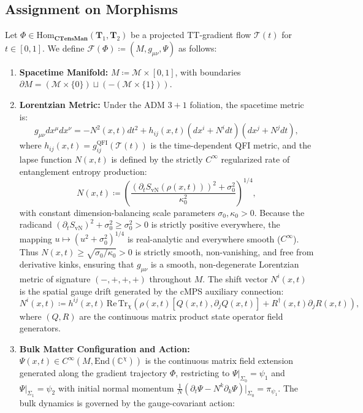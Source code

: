 \documentclass[11pt,a4paper,reqno]{amsart}
\theoremstyle{definition}
\numberwithin{equation}{section}
\newcommand{\CTens}{\mathbf{CTensMan}}
\newcommand{\Tr}{\mathrm{Tr}}
\newcommand{\QFI}{\mathrm{QFI}}
\begin{document}
\subsection{Assignment on Morphisms}
Let $\Phi \in \mathrm{Hom}_{\CTens}(\mathbf{T}_1, \mathbf{T}_2)$ be a projected TT-gradient flow $\mathcal{T}(t)$ for $t \in [0, 1]$.
We define $\mathcal{F}(\Phi) \coloneqq (M, g_{\mu\nu}, \Psi)$ as follows:
\begin{enumerate}
    \item \textbf{Spacetime Manifold:} $M \coloneqq \mathcal{M} \times [0, 1]$, with boundaries $\partial M = (\mathcal{M} \times \{0\}) \sqcup (-(\mathcal{M} \times \{1\}))$.
    \item \textbf{Lorentzian Metric:} Under the ADM $3+1$ foliation, the spacetime metric is:
    \begin{equation}
        g_{\mu\nu} dx^\mu dx^\nu = -N^2(x, t) dt^2 + h_{ij}(x, t) \left( dx^i + N^i dt \right) \left( dx^j + N^j dt \right),
    \end{equation}
    where $h_{ij}(x, t) = g^{\QFI}_{ij}(\mathcal{T}(t))$ is the time-dependent QFI metric, and the lapse function $N(x, t)$ is defined by the strictly $C^\infty$ regularized rate of entanglement entropy production:
    \begin{equation}
        N(x, t) \coloneqq \left( \frac{(\partial_t S_{\mathrm{vN}}(\rho(x, t)))^2 + \sigma_0^2}{\kappa_0^2} \right)^{1/4}, \label{eq:smooth_lapse}
    \end{equation}
    with constant dimension-balancing scale parameters $\sigma_0, \kappa_0 > 0$. Because the radicand $(\partial_t S_{\mathrm{vN}})^2 + \sigma_0^2 \ge \sigma_0^2 > 0$ is strictly positive everywhere, the mapping $u \mapsto (u^2 + \sigma_0^2)^{1/4}$ is real-analytic and everywhere smooth ($C^\infty$). Thus $N(x, t) \ge \sqrt{\sigma_0/\kappa_0} > 0$ is strictly smooth, non-vanishing, and free from derivative kinks, ensuring that $g_{\mu\nu}$ is a smooth, non-degenerate Lorentzian metric of signature $(-, +, +, +)$ throughout $M$. The shift vector $N^i(x, t)$ is the spatial gauge drift generated by the cMPS auxiliary connection:
    \begin{equation}
        N^i(x, t) \coloneqq h^{ij}(x, t) \, \mathrm{Re} \, \Tr_{\chi} \left( \rho(x, t) \left[ Q(x, t), \partial_j Q(x, t) \right] + R^\dagger(x, t) \partial_j R(x, t) \right),
    \end{equation}
    where $(Q, R)$ are the continuous matrix product state operator field generators.
    \item \textbf{Bulk Matter Configuration and Action:} $\Psi(x, t) \in C^\infty(M, \mathrm{End}(\mathbb{C}^\chi))$ is the continuous matrix field extension generated along the gradient trajectory $\Phi$, restricting to $\Psi|_{\Sigma_0} = \psi_1$ and $\Psi|_{\Sigma_1} = \psi_2$ with initial normal momentum $\frac{1}{N}(\partial_t \Psi - N^k \partial_k \Psi)|_{\Sigma_0} = \pi_{\psi_1}$. The bulk dynamics is governed by the gauge-covariant action:

\end{enumerate}
\end{document}
